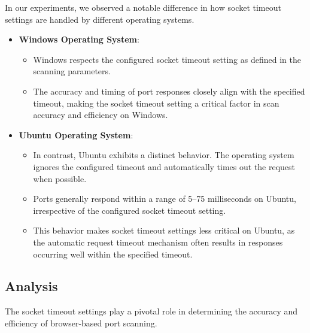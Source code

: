 In our experiments, we observed a notable difference in how socket timeout settings are handled by different operating systems.

\begin{itemize}
    \item \textbf{Windows Operating System}:
    \begin{itemize}
        \item Windows respects the configured socket timeout setting as defined in the scanning parameters.
        \item The accuracy and timing of port responses closely align with the specified timeout, making the socket timeout setting a critical factor in scan accuracy and efficiency on Windows.
    \end{itemize}
    
    \item \textbf{Ubuntu Operating System}:
    \begin{itemize}
        \item In contrast, Ubuntu exhibits a distinct behavior. The operating system ignores the configured timeout and automatically times out the request when possible.
        \item Ports generally respond within a range of 5--75 milliseconds on Ubuntu, irrespective of the configured socket timeout setting.
        \item This behavior makes socket timeout settings less critical on Ubuntu, as the automatic request timeout mechanism often results in responses occurring well within the specified timeout.
    \end{itemize}
\end{itemize}


\subsection{Analysis}

The socket timeout settings play a pivotal role in determining the accuracy and efficiency of browser-based port scanning.

